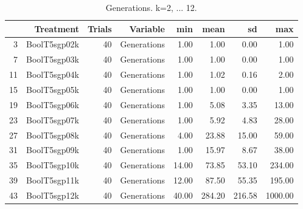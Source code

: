 \begin{table}[ht]
\centering
\begin{tabular}{rrrrrrrr}
  \hline
 & Treatment & Trials & Variable & min & mean & sd & max \\ 
  \hline
3 & BoolT5sgp02k &  40 & Generations & 1.00 & 1.00 & 0.00 & 1.00 \\ 
  7 & BoolT5sgp03k &  40 & Generations & 1.00 & 1.00 & 0.00 & 1.00 \\ 
  11 & BoolT5sgp04k &  40 & Generations & 1.00 & 1.02 & 0.16 & 2.00 \\ 
  15 & BoolT5sgp05k &  40 & Generations & 1.00 & 1.00 & 0.00 & 1.00 \\ 
  19 & BoolT5sgp06k &  40 & Generations & 1.00 & 5.08 & 3.35 & 13.00 \\ 
  23 & BoolT5sgp07k &  40 & Generations & 1.00 & 5.92 & 4.83 & 28.00 \\ 
  27 & BoolT5sgp08k &  40 & Generations & 4.00 & 23.88 & 15.00 & 59.00 \\ 
  31 & BoolT5sgp09k &  40 & Generations & 1.00 & 15.97 & 8.67 & 38.00 \\ 
  35 & BoolT5sgp10k &  40 & Generations & 14.00 & 73.85 & 53.10 & 234.00 \\ 
  39 & BoolT5sgp11k &  40 & Generations & 12.00 & 87.50 & 55.35 & 195.00 \\ 
  43 & BoolT5sgp12k &  40 & Generations & 40.00 & 284.20 & 216.58 & 1000.00 \\ 
   \hline
\end{tabular}
\caption{Generations. k=2, ... 12.} 
\end{table}
